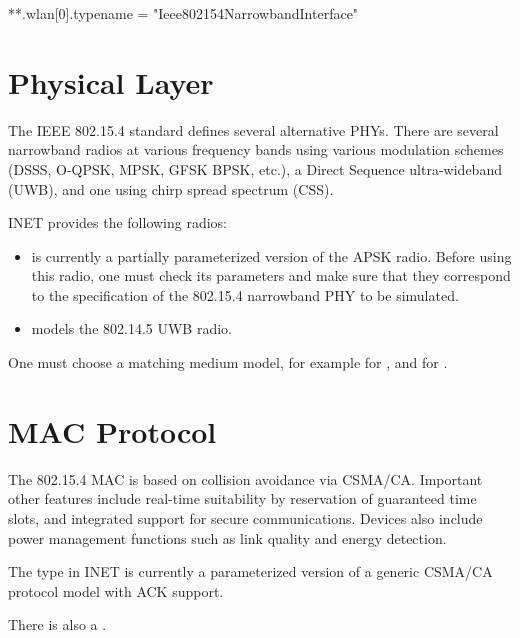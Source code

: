 \begin{inifile}
**.wlan[0].typename = "Ieee802154NarrowbandInterface"
\end{inifile}

\section{Physical Layer}
\label{sec:802154:physical-layer}

The IEEE 802.15.4 standard defines several alternative PHYs. There are
several narrowband radios at various frequency bands using various modulation
schemes (DSSS, O-QPSK, MPSK, GFSK BPSK, etc.), a Direct Sequence ultra-wideband
(UWB), and one using chirp spread spectrum (CSS).

INET provides the following radios:

\begin{itemize}
  \item {} is currently a partially
    parameterized version of the APSK radio. Before using this radio,
    one must check its parameters and make sure that they correspond to the
    specification of the 802.15.4 narrowband PHY to be simulated.
  \item {} models the 802.14.5 UWB radio.
\end{itemize}

One must choose a matching medium model, for example
 for ,
and  for
.


\section{MAC Protocol}
\label{sec:802154:mac-protocol}

The 802.15.4 MAC is based on collision avoidance via CSMA/CA. Important other
features include real-time suitability by reservation of guaranteed time slots,
and integrated support for secure communications. Devices also include power
management functions such as link quality and energy detection.

The  type in INET is currently a parameterized
version of a generic CSMA/CA protocol model with ACK support.

There is also a .



